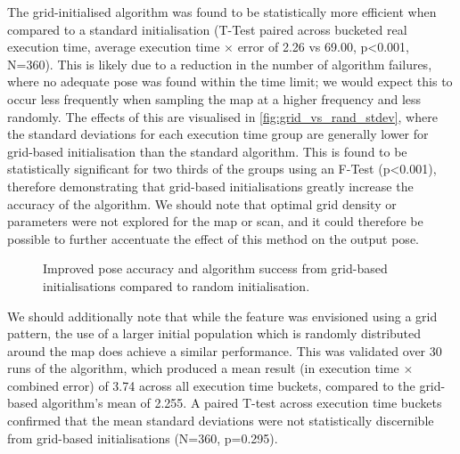 \documentclass[authoryearcitations]{UoYCSproject}
\begin{document}
The grid-initialised algorithm was found to be statistically more efficient when compared to a standard initialisation (T-Test paired across bucketed real execution time, average execution time $\times$ error of 2.26 vs 69.00, p<0.001, N=360). This is likely due to a reduction in the number of algorithm failures, where no adequate pose was found within the time limit; we would expect this to occur less frequently when sampling the map at a higher frequency and less randomly. The effects of this are visualised in \autoref{fig:grid_vs_rand_stdev}, where the standard deviations for each execution time group are generally lower for grid-based initialisation than the standard algorithm. This is found to be statistically significant for two thirds of the groups using an F-Test (p<0.001), therefore demonstrating that grid-based initialisations greatly increase the accuracy of the algorithm. We should note that optimal grid density or parameters were not explored for the map or scan, and it could therefore be possible to further accentuate the effect of this method on the output pose.\newline

\datatablegridstdev

\begin{figure}
	\centering
	\caption[Grid vs. random population layout]{Improved pose accuracy and algorithm success from grid-based initialisations compared to random initialisation.}
	\label{fig:grid_vs_rand_stdev}
\end{figure}
We should additionally note that while the feature was envisioned using a grid pattern, the use of a larger initial population which is randomly distributed around the map does achieve a similar performance. This was validated over 30 runs of the algorithm, which produced a mean result (in execution time $\times$ combined error) of 3.74 across all execution time buckets, compared to the grid-based algorithm's mean of 2.255. A paired T-test across execution time buckets confirmed that the mean standard deviations were not statistically discernible from grid-based initialisations (N=360, p=0.295). \newline
\end{document}

